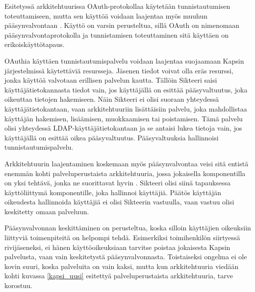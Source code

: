 Esitetyssä arkkitehtuurissa OAuth-protokollaa käytetään tunnistautumisen toteuttamiseen, mutta sen käyttöä voidaan laajentaa myös muuhun pääsynvalvontaan \cite{distributed_web_security}. Käyttö on varsin perusteltua, sillä OAuth on nimenomaan pääsynvalvontaprotokolla ja tunnistamisen toteuttaminen sitä käyttäen on erikoiskäyttötapaus.

OAuthia käyttäen tunnistautumispalvelu voidaan laajentaa suojaamaan Kapsin järjestelmissä käytettäviä resursseja. Jäsenen tiedot voivat olla eräs resurssi, jonka käyttöä valvotaan erillisen pal\-ve\-lun kautta. Tällöin Sikteeri saisi käyttäjätietokannasta tiedot vain, jos käyttäjällä on esittää pääsyvaltuutus, joka oikeuttaa tietojen hakemiseen. Näin Sikteeri ei olisi suoraan yhteydessä käyttäjätietokantaan, vaan arkkitehtuuriin lisättäisiin palvelu, joka mahdollistaa käyttäjän hakemisen, lisäämisen, muokkaamisen tai poistamisen. Tämä palvelu olisi yhteydessä LDAP-käyttäjätietokantaan ja se antaisi lukea tietoja vain, jos käyttäjällä on esittää oikea pääsyvaltuutus. Pääsyvaltuuksia hallinnoisi tunnistautumispalvelu.

Arkkitehtuurin laajentaminen koskemaan myös pääsynvalvontaa veisi sitä entistä enemmän kohti palveluperustaista arkkitehtuuria, jossa jokaisella komponentilla on yksi tehtävä, jonka ne suorittavat hyvin \cite{soa}. Sikteeri olisi siinä tapauksessa käyttöliittymä komponentille, joka hallinnoi käyttäjiä. Päätös käyttäjän oikeudesta hallinnoida käyttäjiä ei olisi Sikteerin vastuulla, vaan vastuu olisi keskitetty omaan palveluun.

Pääsynvalvonnan keskittäminen on perusteltua, koska silloin käyttäjien oikeuksiin liittyviä toimenpiteitä on helpompi tehdä. Esimerkiksi toimihenkilön siirtyessä rivijäseneksi, ei hänen käyttöoikeuksiaan tarvitse poistaa jokaisesta Kapsin palvelusta, vaan vain keskitetystä pääsynvalvonnasta. Toistaiseksi ongelma ei ole kovin suuri, koska palveluita on vain kaksi, mutta kun arkkitehtuuria viedään kohti kuvassa \ref{kapsi_uusi} esitettyä palveluperustaista arkkitehtuuria, tarve korostuu.